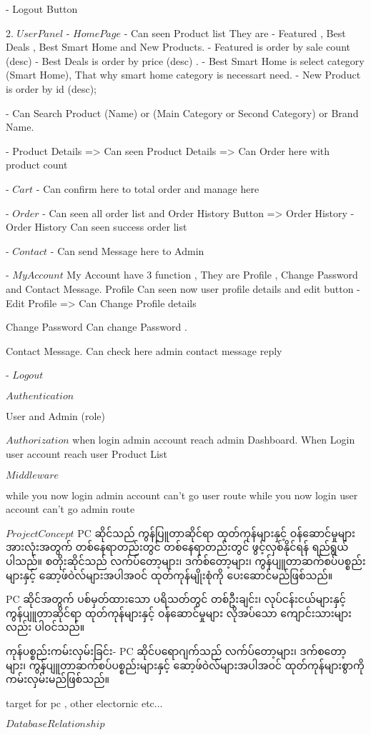 - Logout Button

2. $User Panel$
- $Home Page$
    - Can seen Product list
        They are
            - Featured , Best Deals , Best Smart Home and New Products.
    - Featured is order by sale count (desc)
    - Best Deals is order by price (desc) .
    - Best Smart Home is select category (Smart Home), That why smart home category is necessart need.
    - New Product is order by id (desc);

    - Can Search Product (Name) or (Main Category or Second Category) or Brand Name.

    - Product Details
        => Can seen Product Details
        => Can Order here with product count

- $Cart$
    - Can confirm here to total order and manage here

- $Order$
    - Can seen all order list and Order History Button
        => Order History
            - Order History
                Can seen success order list

- $Contact$
    - Can send Message here to Admin

- $My Account$
    My Account have 3 function ,
    They are Profile , Change Password and Contact Message.
        Profile
            Can seen now user profile details and edit button
                - Edit Profile
                    => Can Change Profile details

        Change Password
            Can change Password .

        Contact Message.
            Can check here admin contact message reply

- $Logout$


$Authentication$

User and Admin (role)

$Authorization$
when login admin account reach admin Dashboard.
When Login user account reach user Product List

$Middleware$

while you now login admin account can't go user route
while you now login user account can't go admin route

$Project Concept$
PC ဆိုင်သည် ကွန်ပြူတာဆိုင်ရာ ထုတ်ကုန်များနှင့် ဝန်ဆောင်မှုများအားလုံးအတွက် တစ်နေရာတည်းတွင် တစ်နေရာတည်းတွင် ဖွင့်လှစ်နိုင်ရန် ရည်ရွယ်ပါသည်။ စတိုးဆိုင်သည် လက်ပ်တော့များ၊ ဒက်စ်တော့များ၊ ကွန်ပျူတာဆက်စပ်ပစ္စည်းများနှင့် ဆော့ဖ်ဝဲလ်များအပါအဝင် ထုတ်ကုန်မျိုးစုံကို ပေးဆောင်မည်ဖြစ်သည်။


PC ဆိုင်အတွက် ပစ်မှတ်ထားသော ပရိသတ်တွင် တစ်ဦးချင်း၊ လုပ်ငန်းငယ်များနှင့် ကွန်ပျူတာဆိုင်ရာ ထုတ်ကုန်များနှင့် ဝန်ဆောင်မှုများ လိုအပ်သော ကျောင်းသားများလည်း ပါဝင်သည်။


ကုန်ပစ္စည်းကမ်းလှမ်းခြင်း- PC ဆိုင်ပရောဂျက်သည် လက်ပ်တော့များ၊ ဒက်စတော့များ၊ ကွန်ပျူတာဆက်စပ်ပစ္စည်းများနှင့် ဆော့ဖ်ဝဲလ်များအပါအဝင် ထုတ်ကုန်များစွာကို ကမ်းလှမ်းမည်ဖြစ်သည်။


target for pc , other electornic etc...

$Database Relationship$


